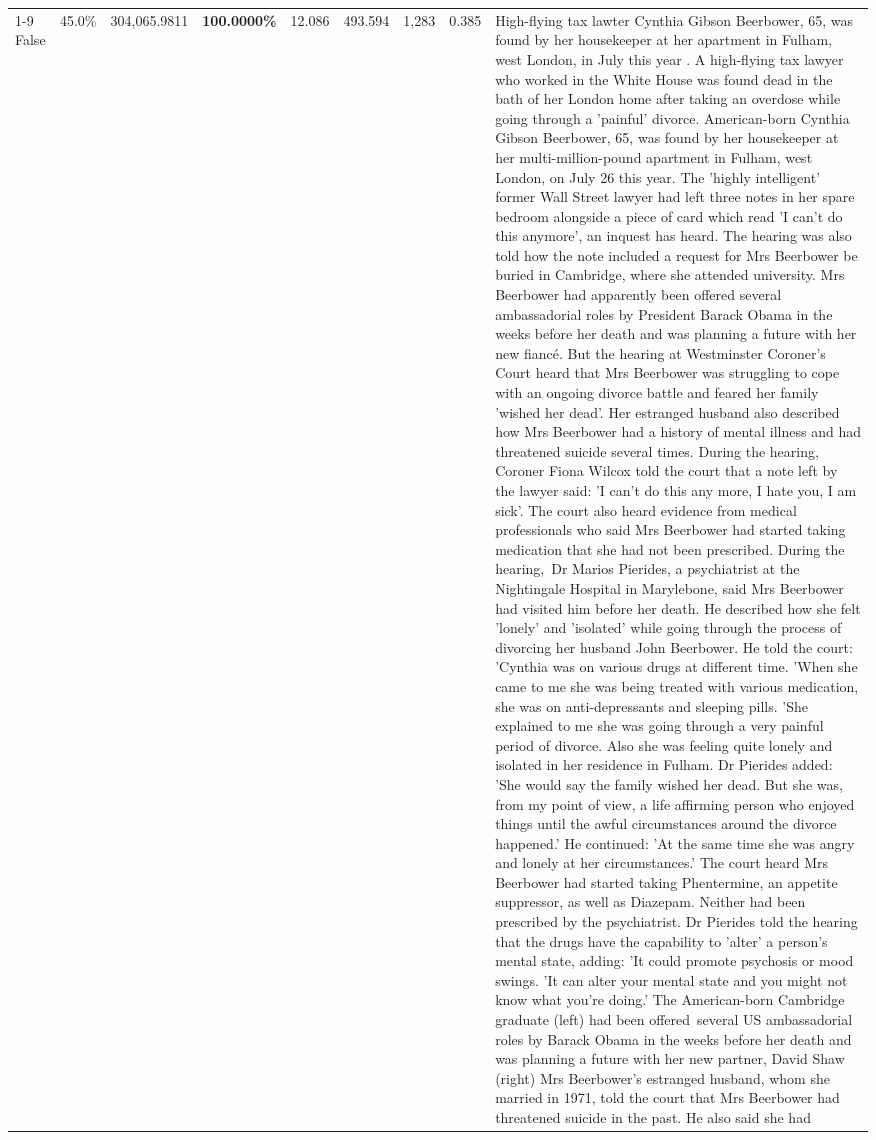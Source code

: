 \begin{table}[H]
\begin{tabular}{lllrlllll}
\cline{1-9}
False & 45.0\% & \color{red} 304,065.9811 & \bfseries \color{red} 100.0000\% & 12.086 & 493.594 & 1,283 & 0.385 & High-flying tax lawter Cynthia Gibson Beerbower, 65, was found by her housekeeper at her apartment in Fulham, west London, in July this year . A high-flying tax lawyer who worked in the White House was found dead in the bath of her London home after taking an overdose while going through a 'painful' divorce. American-born Cynthia Gibson Beerbower, 65, was found by her housekeeper at her multi-million-pound apartment in Fulham, west London, on July 26 this year. The 'highly intelligent' former Wall Street lawyer had left three notes in her spare bedroom alongside a piece of card which read 'I can't do this anymore', an inquest has heard. The hearing was also told how the note included a request for Mrs Beerbower be buried in Cambridge, where she attended university. Mrs Beerbower had apparently been offered several ambassadorial roles by President Barack Obama in the weeks before her death and was planning a future with her new fiancé. But the hearing at Westminster Coroner's Court heard that Mrs Beerbower was struggling to cope with an ongoing divorce battle and feared her family 'wished her dead'. Her estranged husband also described how Mrs Beerbower had a history of mental illness and had threatened suicide several times. During the hearing, Coroner Fiona Wilcox told the court that a note left by the lawyer said: 'I can't do this any more, I hate you, I am sick'. The court also heard evidence from medical professionals who said Mrs Beerbower had started taking medication that she had not been prescribed. During the hearing, Dr Marios Pierides, a psychiatrist at the Nightingale Hospital in Marylebone, said Mrs Beerbower had visited him before her death. He described how she felt 'lonely' and 'isolated' while going through the process of divorcing her husband John Beerbower. He told the court: 'Cynthia was on various drugs at different time. 'When she came to me she was being treated with various medication, she was on anti-depressants and sleeping pills. 'She explained to me she was going through a very painful period of divorce. Also she was feeling quite lonely and isolated in her residence in Fulham. Dr Pierides added: 'She would say the family wished her dead. But she was, from my point of view, a life affirming person who enjoyed things until the awful circumstances around the divorce happened.' He continued: 'At the same time she was angry and lonely at her circumstances.' The court heard Mrs Beerbower had started taking Phentermine, an appetite suppressor, as well as Diazepam. Neither had been prescribed by the psychiatrist. Dr Pierides told the hearing that the drugs have the capability to 'alter' a person's mental state, adding: 'It could promote psychosis or mood swings. 'It can alter your mental state and you might not know what you're doing.' The American-born Cambridge graduate (left) had been offered several US ambassadorial roles by Barack Obama in the weeks before her death and was planning a future with her new partner, David Shaw (right) Mrs Beerbower's estranged husband, whom she married in 1971, told the court that Mrs Beerbower had threatened suicide in the past. He also said she had 
\end{tabular}
\end{table}
